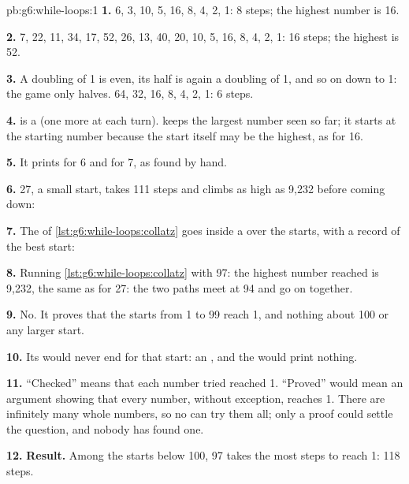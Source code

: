 \begin{solution}{pb:g6:while-loops:1}
\textbf{1.} 6, 3, 10, 5, 16, 8, 4, 2, 1: 8 steps; the highest number is 16.

\textbf{2.} 7, 22, 11, 34, 17, 52, 26, 13, 40, 20, 10, 5, 16, 8, 4, 2, 1: 16
steps; the highest is 52.

\textbf{3.} A doubling of 1 is even, its half is again a doubling of 1, and so
on down to 1: the game only halves. 64, 32, 16, 8, 4, 2, 1: 6 steps.

\textbf{4.}  is a  (one more at each turn). 
keeps the largest number seen so far; it starts at the starting number because
the start itself may be the highest, as for 16.

\textbf{5.} It prints  for 6 and  for 7, as found by hand.

\textbf{6.} 27, a small start, takes 111 steps and climbs as high as 9,232
before coming down:

\label{out:g6:while-loops:collatz}

\textbf{7.} The   of \cref{lst:g6:while-loops:collatz} goes
inside a   over the starts, with a record of the best start:

\label{lst:g6:while-loops:collatz-record}

\label{out:g6:while-loops:collatz-record}

\textbf{8.} Running \cref{lst:g6:while-loops:collatz} with 97: the highest
number reached is 9,232, the same as for 27: the two paths meet at 94 and go
on together.

\textbf{9.} No. It proves that the starts from 1 to 99 reach 1, and nothing
about 100 or any larger start.

\textbf{10.} Its   would never end for that start: an , and the  would print nothing.

\textbf{11.} ``Checked'' means that each number tried reached 1. ``Proved''
would mean an argument showing that every number, without exception, reaches
1. There are infinitely many whole numbers, so no  can try them all;
only a proof could settle the question, and nobody has found one.

\textbf{12.} \textbf{Result.} Among the starts below 100, 97 takes the most
steps to reach 1: 118 steps.
\end{solution}

